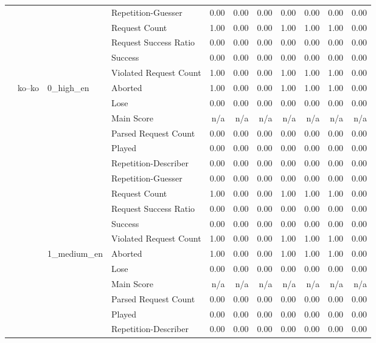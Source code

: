 \begin{tabular}{llllrrrrrrr}
 &  &  & Repetition-Guesser & 0.00 & 0.00 & 0.00 & 0.00 & 0.00 & 0.00 & 0.00 \\
 &  &  & Request Count & 1.00 & 0.00 & 0.00 & 1.00 & 1.00 & 1.00 & 0.00 \\
 &  &  & Request Success Ratio & 0.00 & 0.00 & 0.00 & 0.00 & 0.00 & 0.00 & 0.00 \\
 &  &  & Success & 0.00 & 0.00 & 0.00 & 0.00 & 0.00 & 0.00 & 0.00 \\
 &  &  & Violated Request Count & 1.00 & 0.00 & 0.00 & 1.00 & 1.00 & 1.00 & 0.00 \\
\cline{2-11} \cline{3-11}
 & \multirow[t]{33}{*}{ko--ko} & \multirow[t]{11}{*}{0_high_en} & Aborted & 1.00 & 0.00 & 0.00 & 1.00 & 1.00 & 1.00 & 0.00 \\
 &  &  & Lose & 0.00 & 0.00 & 0.00 & 0.00 & 0.00 & 0.00 & 0.00 \\
 &  &  & Main Score & n/a & n/a & n/a & n/a & n/a & n/a & n/a \\
 &  &  & Parsed Request Count & 0.00 & 0.00 & 0.00 & 0.00 & 0.00 & 0.00 & 0.00 \\
 &  &  & Played & 0.00 & 0.00 & 0.00 & 0.00 & 0.00 & 0.00 & 0.00 \\
 &  &  & Repetition-Describer & 0.00 & 0.00 & 0.00 & 0.00 & 0.00 & 0.00 & 0.00 \\
 &  &  & Repetition-Guesser & 0.00 & 0.00 & 0.00 & 0.00 & 0.00 & 0.00 & 0.00 \\
 &  &  & Request Count & 1.00 & 0.00 & 0.00 & 1.00 & 1.00 & 1.00 & 0.00 \\
 &  &  & Request Success Ratio & 0.00 & 0.00 & 0.00 & 0.00 & 0.00 & 0.00 & 0.00 \\
 &  &  & Success & 0.00 & 0.00 & 0.00 & 0.00 & 0.00 & 0.00 & 0.00 \\
 &  &  & Violated Request Count & 1.00 & 0.00 & 0.00 & 1.00 & 1.00 & 1.00 & 0.00 \\
\cline{3-11}
 &  & \multirow[t]{11}{*}{1_medium_en} & Aborted & 1.00 & 0.00 & 0.00 & 1.00 & 1.00 & 1.00 & 0.00 \\
 &  &  & Lose & 0.00 & 0.00 & 0.00 & 0.00 & 0.00 & 0.00 & 0.00 \\
 &  &  & Main Score & n/a & n/a & n/a & n/a & n/a & n/a & n/a \\
 &  &  & Parsed Request Count & 0.00 & 0.00 & 0.00 & 0.00 & 0.00 & 0.00 & 0.00 \\
 &  &  & Played & 0.00 & 0.00 & 0.00 & 0.00 & 0.00 & 0.00 & 0.00 \\
 &  &  & Repetition-Describer & 0.00 & 0.00 & 0.00 & 0.00 & 0.00 & 0.00 & 0.00 \\

\end{tabular}
